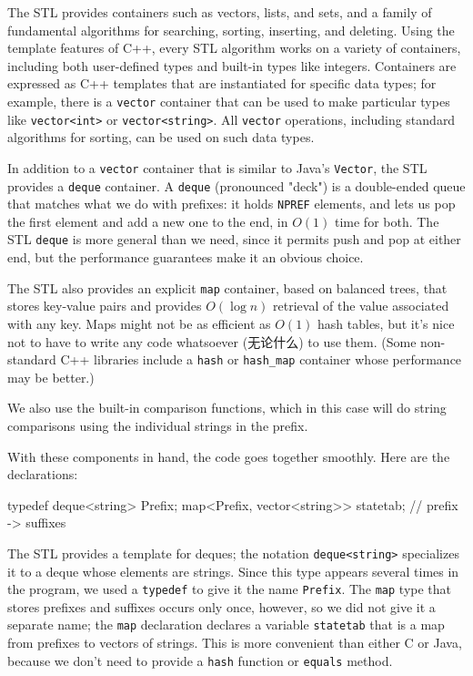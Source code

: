 The STL provides containers such as vectors, lists, and sets, and a family
of fundamental algorithms for searching, sorting, inserting, and deleting.
Using the template features of C++, every STL algorithm works on a variety
of containers, including both user-defined types and built-in types like
integers. Containers are expressed as C++ templates that are instantiated
for specific data types; for example, there is a \verb'vector' container
that can be used to make particular types like \verb'vector<int>' or
\verb'vector<string>'. All \verb'vector' operations, including standard
algorithms for sorting, can be used on such data types.

In addition to a \verb'vector' container that is similar to Java's
\verb'Vector', the STL provides a \verb'deque' container. A \verb'deque'
(pronounced "deck") is a double-ended queue that matches what we do with
prefixes: it holds \verb'NPREF' elements, and lets us pop the first element
and add a new one to the end, in $O(1)$ time for both. The STL \verb'deque'
is more general than we need, since it permits push and pop at either end,
but the performance guarantees make it an obvious choice.

The STL also provides an explicit \verb'map' container, based on balanced
trees, that stores key-value pairs and provides $O(\log n)$ retrieval of
the value associated with any key. Maps might not be as efficient as $O(1)$
hash tables, but it's nice not to have to write any code whatsoever
(无论什么) to use them. (Some non-standard C++ libraries include a
\verb'hash' or \verb'hash_map' container whose performance may be better.)

We also use the built-in comparison functions, which in this case will do
string comparisons using the individual strings in the prefix.

With these components in hand, the code goes together smoothly. Here are
the declarations:
\begin{wellcode}
    typedef deque<string> Prefix;
    map<Prefix, vector<string>> statetab; // prefix -> suffixes
\end{wellcode}

The STL provides a template for deques; the notation \verb'deque<string>'
specializes it to a deque whose elements are strings. Since this type
appears several times in the program, we used a \verb'typedef' to give it
the name \verb'Prefix'.  The \verb'map' type that stores prefixes and
suffixes occurs only once, however, so we did not give it a separate name;
the \verb'map' declaration declares a variable \verb'statetab' that is a
map from prefixes to vectors of strings. This is more convenient than
either C or Java, because we don't need to provide a \verb'hash' function
or \verb'equals' method.

